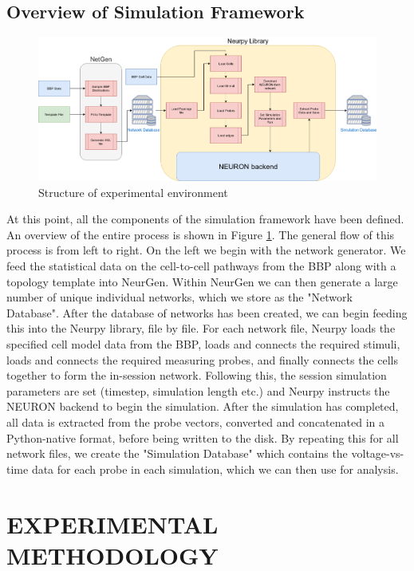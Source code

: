 \documentclass[letterpaper, 10 pt, conference]{ieeeconf}  %
\begin{document}
\subsection*{Overview of Simulation Framework}
\begin{figure}[ht]
    \centering
    \includegraphics[width=\textwidth]{SimFW.png}
    \caption{Structure of experimental environment}
    \label{fig:nrpySimFw}
\end{figure}
At this point, all the components of the simulation framework have been defined. An overview of the entire process is shown in Figure \ref{fig:nrpySimFw}. The general flow of this process is from left to right. On the left we begin with the network generator. We feed the statistical data on the cell-to-cell pathways from the BBP along with a topology template into NeurGen. Within NeurGen we can then generate a large number of unique individual networks, which we store as the "Network Database". After the database of networks has been created, we can begin feeding this into the Neurpy library, file by file. For each network file, Neurpy loads the specified cell model data from the BBP, loads and connects the required stimuli, loads and connects the required measuring probes, and finally connects the cells together to form the in-session network. Following this, the session simulation parameters are set (timestep, simulation length etc.) and Neurpy instructs the NEURON backend to begin the simulation. After the simulation has completed, all data is extracted from the probe vectors, converted and concatenated in a Python-native format, before being written to the disk. By repeating this for all network files, we create the "Simulation Database" which contains the voltage-vs-time data for each probe in each simulation, which we can then use for analysis.\\
\section{EXPERIMENTAL METHODOLOGY}
\end{document}
